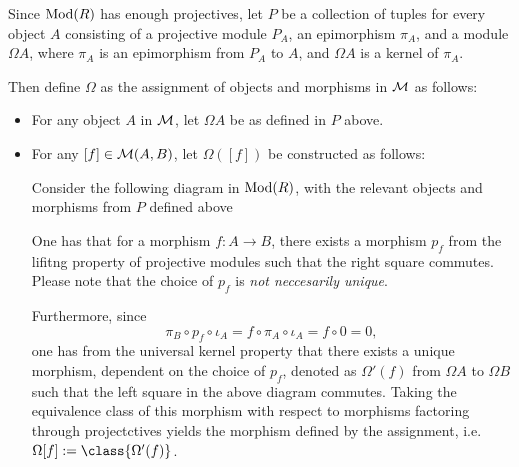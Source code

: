 \begin{definition}
    \label{def:stmod_omega}
    Since \( \operatorname{Mod}(R) \) has enough projectives, let \( P \) be a collection of tuples for every object \( A \) consisting of a projective module \( P_A \), an epimorphism \( \pi_A \), and a module \( \Omega A \), where \( \pi_A \) is an epimorphism from \( P_A \) to \( A \), and \( \Omega A \) is a kernel of \( \pi_A \).

    Then define \( \Omega \) as the assignment of objects and morphisms in \( {\mathcal{M}} \) as follows:
    \begin{itemize}
        \item {
            For any object \( A \) in \( {\mathcal{M}} \), let \( \Omega A \) be as defined in \( P \) above.
        }
        \item {
            For any \( [f] \in {\mathcal{M}}(A, B) \), let \( \Omega([f]) \) be constructed as follows:

            Consider the following diagram in \( \operatorname{Mod}(R) \), with the relevant objects and morphisms from \( P \) defined above
            \begin{center}
            \end{center}

            One has that for a morphism \( f: A \to B \), there exists a morphism \( p_f \) from the lifitng property of projective modules such that the right square commutes. Please note that the choice of \( p_f \) is \emph{not neccesarily unique}.

            Furthermore, since
            \[
                \pi_B \circ p_f \circ \iota_A = f \circ \pi_A \circ \iota_A = f \circ 0 = 0,
            \]
            one has from the universal kernel property that there exists a unique morphism, dependent on the choice of \( p_f \), denoted as \( \Omega'(f) \) from \( \Omega A \) to \( \Omega B \) such that the left square in the above diagram commutes. Taking the equivalence class of this morphism with respect to morphisms factoring through projectctives yields the morphism defined by the assignment, i.e. \( \Omega [f] := \class{\Omega'(f)} \).
        }
    \end{itemize}
\end{definition}

